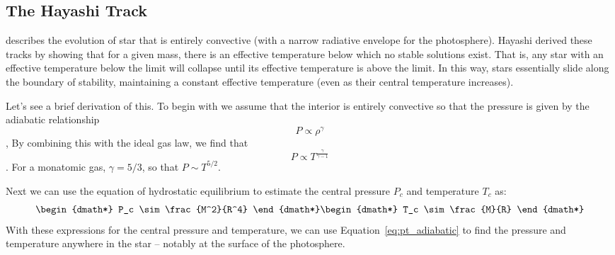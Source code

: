 \subsection{The Hayashi Track}\label{sec:hayashi}
describes the evolution of star that is entirely convective
(with a narrow radiative envelope for the photosphere).
Hayashi derived these tracks by showing that for
a given mass, there is an effective temperature below which no stable solutions exist.
That is, any star with an effective temperature below the limit will collapse until its
effective temperature is above the limit.  In this way, stars essentially slide along
the boundary of stability, maintaining a constant effective temperature
(even as their central temperature increases).

Let's see a brief derivation of this.  To begin with we assume that the interior is entirely
convective so that the pressure is given by the adiabatic relationship
\begin{dmath}
    P\propto\rho^\gamma
\end{dmath},
By combining this with the ideal gas law, we find that
\begin{dmath}\label{eq:pt_adiabatic}
    P\propto T^{\frac{\gamma}{\gamma-1}}
\end{dmath}.
For a monatomic gas, $\gamma=5/3$, so that $P\sim T^{5/2}$.

Next we can use the equation of hydrostatic equilibrium to estimate the central pressure $P_c$ and
temperature $T_c$ as:
\begin{dgroup*}
\begin{dmath*}
    P_c \sim \frac{M^2}{R^4}
\end{dmath*}
\begin{dmath*}
    T_c \sim \frac{M}{R}
\end{dmath*}
\end{dgroup*}
With these expressions for the central pressure and temperature, we can use
Equation~\ref{eq:pt_adiabatic} to find the pressure and temperature anywhere in the
star -- notably at the surface of the photosphere.

